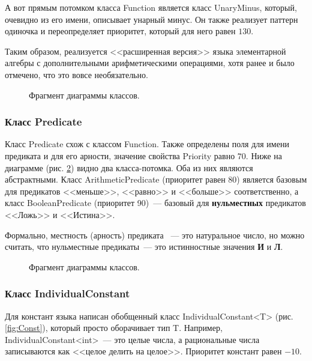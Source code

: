 А вот прямым потомком класса Function является класс UnaryMinus, который, очевидно из его имени, описывает унарный минус. Он также реализует паттерн одиночка и переопределяет приоритет, который для него равен $130$.

Таким образом, реализуется <<расширенная версия>> языка элементарной алгебры с дополнительными арифметическими операциями, хотя ранее и было отмечено, что это вовсе необязательно.

\begin{figure}[h]
    \caption{Фрагмент диаграммы классов.}
    \label{fig:Function-inh}
\end{figure}

\subsubsection{Класс Predicate}

Класс Predicate схож с классом Function. Также определены поля для имени предиката и для его арности, значение свойства Priority равно $70$. Ниже на диаграмме (рис. \ref{fig:Predicate}) видно два класса-потомка. Оба из них являются абстрактными. Класс ArithmeticPredicate (приоритет равен 80) является базовым для предикатов <<меньше>>, <<равно>> и <<больше>> соответственно, а класс BooleanPredicate (приоритет 90)~--- базовый для \textbf{нульместных} предикатов <<Ложь>> и <<Истина>>.

\begin{remark}
    Формально, местность (арность) предиката ~--- это натуральное число, но можно считать, что нульместные предикаты~--- это истинностные значения \textbf{И} и \textbf{Л}.
\end{remark}

\begin{figure}[h]
    \caption{Фрагмент диаграммы классов.}
    \label{fig:Predicate}
\end{figure}

\subsubsection{Класс IndividualConstant}

Для констант языка написан обобщенный класс IndividualConstant<T> (рис. \ref{fig:Const}), который просто оборачивает тип T. Например, IndividualConstant<int>~--- это целые числа, а рациональные числа записываются как <<целое делить на целое>>. Приоритет констант равен $-10$.

